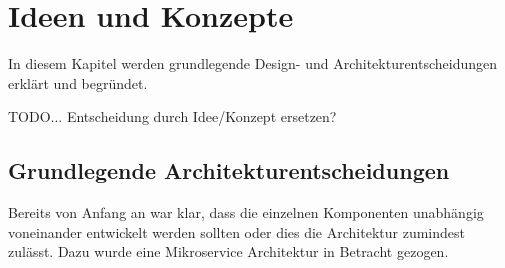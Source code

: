 \chapter{Ideen und Konzepte}




%



%
%

In diesem Kapitel werden grundlegende Design- und Architekturentscheidungen erklärt
und begründet.

TODO... Entscheidung durch Idee/Konzept ersetzen?

\section{Grundlegende Architekturentscheidungen}
\label{konzepte:microservices}

Bereits von Anfang an war klar, dass die einzelnen Komponenten unabhängig voneinander
entwickelt werden sollten oder dies die Architektur zumindest zulässt. Dazu wurde
eine Mikroservice Architektur in Betracht gezogen.

